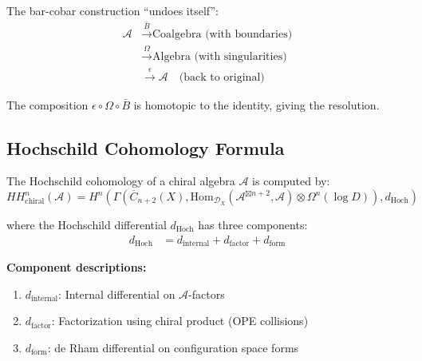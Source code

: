 \begin{remark}
The bar-cobar construction ``undoes itself'':
\begin{align*}
\mathcal{A} &\xrightarrow{\bar{B}} \text{Coalgebra (with boundaries)}\\
&\xrightarrow{\Omega} \text{Algebra (with singularities)}\\
&\xrightarrow{\epsilon} \mathcal{A} \quad \text{(back to original)}
\end{align*}

The composition $\epsilon \circ \Omega \circ \bar{B}$ is homotopic to the identity, giving
the resolution.
\end{remark}

\subsection{Hochschild Cohomology Formula}

\begin{theorem}\label{thm:HH-config-space-formula}
The Hochschild cohomology of a chiral algebra $\mathcal{A}$ is computed by:
$$HH^n_{\text{chiral}}(\mathcal{A}) = H^n\left(\Gamma\left(\overline{C}_{n+2}(X), 
\text{Hom}_{\mathcal{D}_X}(\mathcal{A}^{\boxtimes n+2}, \mathcal{A}) \otimes \Omega^n(\log D)\right), d_{\text{Hoch}}\right)$$

where the Hochschild differential $d_{\text{Hoch}}$ has three components:
\begin{align}
d_{\text{Hoch}} &= d_{\text{internal}} + d_{\text{factor}} + d_{\text{form}} \label{eq:d-Hoch-decomposition}
\end{align}

\textbf{Component descriptions:}
\begin{enumerate}
\item $d_{\text{internal}}$: Internal differential on $\mathcal{A}$-factors
\item $d_{\text{factor}}$: Factorization using chiral product (OPE collisions)
\item $d_{\text{form}}$: de Rham differential on configuration space forms
\end{enumerate}
\end{theorem}

